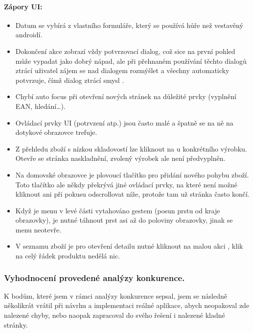 \paragraph{Zápory UI:}
\begin{itemize}
	\item Datum se vybírá z vlastního formuláře, který se používá hůře než vestavěný androidí.
	\item Dokončení akce zobrazí vždy potvrzovací dialog, což sice na první pohled může vypadat jako dobrý nápad, ale při přehnaném používání těchto dialogů ztrácí uživatel zájem se nad dialogem rozmýšlet a všechny automaticky potvrzuje, čímž dialog ztrácí smysl \cite{nn-dialogs}.
	\item Chybí auto focus při otevření nových stránek na důležité prvky (vyplnění EAN, hledání…).
	\item Ovládací prvky UI (potrvzení atp.) jsou často malé a špatně se na ně na dotykové obrazovce trefuje.
	\item Z přehledu zboží s nízkou skladovostí lze kliknout na  u konkrétního výrobku. Otevře se stránka naskladnění, zvolený výrobek ale není předvyplněn.
	\item Na domovské obrazovce je plovoucí tlačítko pro přidání nového pohybu zboží. Toto tlačítko ale někdy překrývá jiné ovládací prvky, na které není možné kliknout ani při pokusu odscrollovat níže, protože tam už stránka často končí.
	\item Když je menu v levé části vytahováno gestem (posun prstu od kraje obrazovky), je nutné táhnout prst asi až do poloviny obrazovky, jinak se menu neotevře.
	\item V seznamu zboží je pro otevření detailu nutné kliknout na malou akci , klik na celý řádek produktu nedělá nic.
\end{itemize}


\subsubsection{Vyhodnocení provedené analýzy konkurence.}

K bodům, které jsem v rámci analýzy konkurence sepsal, jsem se následně několikrát vrátil při návrhu a implementaci reálné aplikace, abych neopakoval zde nalezené chyby, nebo naopak zapracoval do svého řešení i nalezené kladné stránky.
